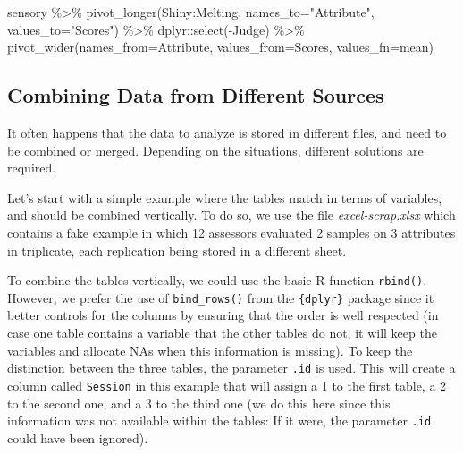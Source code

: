 \documentclass[
]{book}
\newenvironment{Shaded}{\begin{snugshade}}{\end{snugshade}}
\newcommand{\AttributeTok}[1]{\textcolor[rgb]{0.77,0.63,0.00}{#1}}
\newcommand{\FunctionTok}[1]{\textcolor[rgb]{0.00,0.00,0.00}{#1}}
\newcommand{\NormalTok}[1]{#1}
\newcommand{\SpecialCharTok}[1]{\textcolor[rgb]{0.00,0.00,0.00}{#1}}
\newcommand{\StringTok}[1]{\textcolor[rgb]{0.31,0.60,0.02}{#1}}
\begin{document}
\begin{Shaded}
\begin{Highlighting}[]
\NormalTok{sensory }\SpecialCharTok{\%\textgreater{}\%} 
  \FunctionTok{pivot\_longer}\NormalTok{(Shiny}\SpecialCharTok{:}\NormalTok{Melting, }\AttributeTok{names\_to=}\StringTok{"Attribute"}\NormalTok{, }\AttributeTok{values\_to=}\StringTok{"Scores"}\NormalTok{) }\SpecialCharTok{\%\textgreater{}\%} 
\NormalTok{  dplyr}\SpecialCharTok{::}\FunctionTok{select}\NormalTok{(}\SpecialCharTok{{-}}\NormalTok{Judge) }\SpecialCharTok{\%\textgreater{}\%} 
  \FunctionTok{pivot\_wider}\NormalTok{(}\AttributeTok{names\_from=}\NormalTok{Attribute, }\AttributeTok{values\_from=}\NormalTok{Scores, }\AttributeTok{values\_fn=}\NormalTok{mean)}
\end{Highlighting}
\end{Shaded}

\hypertarget{combining-data-from-different-sources}{%
\subsection{Combining Data from Different Sources}\label{combining-data-from-different-sources}}

It often happens that the data to analyze is stored in different files, and need to be combined or merged. Depending on the situations, different solutions are required.

Let's start with a simple example where the tables match in terms of variables, and should be combined vertically.
To do so, we use the file \emph{excel-scrap.xlsx} which contains a fake example in which 12 assessors evaluated 2 samples on 3 attributes in triplicate, each replication being stored in a different sheet.

To combine the tables vertically, we could use the basic R function \texttt{rbind()}. However, we prefer the use of \texttt{bind\_rows()} from the \texttt{\{dplyr\}} package since it better controls for the columns by ensuring that the order is well respected (in case one table contains a variable that the other tables do not, it will keep the variables and allocate NAs when this information is missing). To keep the distinction between the three tables, the parameter \texttt{.id} is used. This will create a column called \texttt{Session} in this example that will assign a 1 to the first table, a 2 to the second one, and a 3 to the third one (we do this here since this information was not available within the tables: If it were, the parameter \texttt{.id} could have been ignored).
\end{document}
